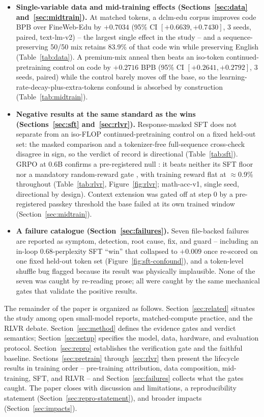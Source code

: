 \begin{itemize}
\item \textbf{Single-variable data and mid-training effects
(Sections~\ref{sec:data} and~\ref{sec:midtrain}).} At matched tokens, a
dclm-edu corpus \citep{li2024datacomp} improves code BPB over FineWeb-Edu by
$+0.7034$ (95\% CI $[+0.6639, +0.7430]$, 3 seeds, paired, text-lm-v2) -- the
largest single effect in the study -- and a sequence-preserving 50/50 mix
retains 83.9\% of that code win while preserving English
(Table~\ref{tab:data}). A premium-mix anneal then beats an iso-token
continued-pretraining control on code by $+0.2716$ BPB (95\% CI
$[+0.2641, +0.2792]$, 3 seeds, paired) while the control barely moves off the
base, so the learning-rate-decay-plus-extra-tokens confound is absorbed by
construction (Table~\ref{tab:midtrain}).

\item \textbf{Negative results at the same standard as the wins
(Sections~\ref{sec:sft} and~\ref{sec:rlvr}).} Response-masked SFT does not
separate from an iso-FLOP continued-pretraining control on a fixed held-out
set: the masked comparison and a tokenizer-free full-sequence cross-check
disagree in sign, so the verdict of record is directional
(Table~\ref{tab:sft}). GRPO at 0.6B confirms a pre-registered null
\citep{yue2025does}: it beats neither its SFT floor nor a mandatory
random-reward gate \citep{shao2025spurious}, with training reward flat at
$\approx$0.9\% throughout (Table~\ref{tab:rlvr}, Figure~\ref{fig:rlvr};
math-acc-v1, single seed, directional by design). Context extension was gated
off at step 0 by a pre-registered passkey threshold the base failed at its own
trained window (Section~\ref{sec:midtrain}).

\item \textbf{A failure catalogue (Section~\ref{sec:failures}).} Seven
file-backed failures are reported as symptom, detection, root cause, fix, and
guard -- including an in-loop 0.68-perplexity SFT ``win'' that collapsed to
$+0.009$ once re-scored on one fixed held-out token set
(Figure~\ref{fig:sft-confound}), and a token-level shuffle bug flagged because
its result was physically implausible. None of the seven was caught by
re-reading prose; all were caught by the same mechanical gates that validate
the positive results.
\end{itemize}

The remainder of the paper is organized as follows.
Section~\ref{sec:related} situates the study among open small-model reports,
matched-compute practice, and the RLVR debate. Section~\ref{sec:method}
defines the evidence gates and verdict semantics; Section~\ref{sec:setup}
specifies the model, data, hardware, and evaluation protocol.
Section~\ref{sec:repro} establishes the verification gate and the faithful
baseline. Sections~\ref{sec:pretrain} through~\ref{sec:rlvr} then present the
lifecycle results in training order -- pre-training attribution, data
composition, mid-training, SFT, and RLVR -- and
Section~\ref{sec:failures} collects what the gates caught. The paper closes
with discussion and limitations, a reproducibility statement
(Section~\ref{sec:repro-statement}), and broader impacts
(Section~\ref{sec:impacts}).
